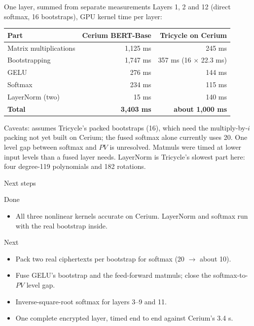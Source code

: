\documentclass[aspectratio=169]{beamer}
\begin{document}
\begin{frame}{One layer, summed from separate measurements}
\small
Layers 1, 2 and 12 (direct softmax, 16 bootstraps), GPU kernel time per layer:
\begin{center}\footnotesize
\begin{tabular}{@{}lrr@{}}
\toprule
\textbf{Part} & \textbf{Cerium BERT-Base} & \textbf{Tricycle on Cerium}\\
\midrule
Matrix multiplications & 1{,}125 ms & 245 ms\\
Bootstrapping & 1{,}747 ms & 357 ms (16 $\times$ 22.3 ms)\\
GELU & 276 ms & 144 ms\\
Softmax & 234 ms & 115 ms\\
LayerNorm (two) & 15 ms & 140 ms\\
\midrule
\textbf{Total} & \textbf{3{,}403 ms} & \textbf{about 1{,}000 ms}\\
\bottomrule
\end{tabular}
\end{center}
{\footnotesize Caveats: assumes Tricycle's packed bootstraps (16), which need the multiply-by-$i$ packing not yet built on Cerium; the fused softmax alone currently uses 20. One level gap between softmax and $PV$ is unresolved. Matmuls were timed at lower input levels than a fused layer needs. LayerNorm is Tricycle's slowest part here: four degree-119 polynomials and 182 rotations.}
\end{frame}

\begin{frame}{Next steps}
\small
\begin{block}{Done}
\begin{itemize}\small
  \item All three nonlinear kernels accurate on Cerium. LayerNorm and softmax run with the real bootstrap inside.
\end{itemize}
\end{block}
\begin{block}{Next}
\begin{itemize}\small
  \item Pack two real ciphertexts per bootstrap for softmax (20 $\to$ about 10).
  \item Fuse GELU's bootstrap and the feed-forward matmuls; close the softmax-to-$PV$ level gap.
  \item Inverse-square-root softmax for layers 3--9 and 11.
  \item One complete encrypted layer, timed end to end against Cerium's 3.4 s.
\end{itemize}
\end{block}
\end{frame}
\end{document}
